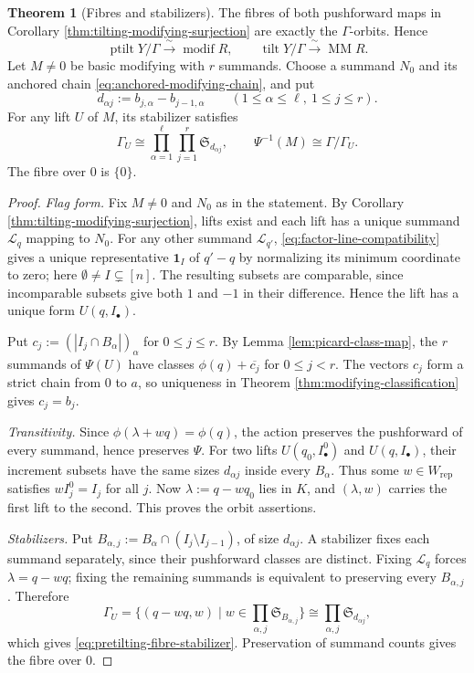 \documentclass[a4paper,reqno]{amsart}
\DeclareMathOperator{\tilt}{tilt}
\DeclareMathOperator{\ptilt}{ptilt}
\DeclareMathOperator{\modif}{modif}
\DeclareMathOperator{\MM}{MM}
\theoremstyle{definition}
\newtheorem{Thm}{Theorem}[section]
\begin{document}
\begin{Thm}[Fibres and stabilizers]\label{thm:pushforward-fibres}
The fibres of both pushforward maps in Corollary \ref{thm:tilting-modifying-surjection} are exactly the $\Gamma$-orbits. Hence
\begin{equation}\label{eq:modifying-orbit-classification}
\ptilt Y/\Gamma\xrightarrow{\ \sim\ }\modif R,
\qquad
\tilt Y/\Gamma\xrightarrow{\ \sim\ }\MM R.
\end{equation}
Let $M\ne0$ be basic modifying with $r$ summands. Choose a summand $N_0$ and its anchored chain \eqref{eq:anchored-modifying-chain}, and put
\[
d_{\alpha j}:=b_{j,\alpha}-b_{j-1,\alpha}
\qquad(1\le\alpha\le\ell,\ 1\le j\le r).
\]
For any lift $U$ of $M$, its stabilizer satisfies
\begin{equation}\label{eq:pretilting-fibre-stabilizer}
\Gamma_U\cong\prod_{\alpha=1}^\ell\prod_{j=1}^r
\mathfrak S_{d_{\alpha j}},\qquad
\Psi^{-1}(M)\cong\Gamma/\Gamma_U.
\end{equation}
The fibre over $0$ is $\{0\}$.
\end{Thm}
\begin{proof}
\emph{Flag form.}
Fix $M\ne0$ and $N_0$ as in the statement. By Corollary \ref{thm:tilting-modifying-surjection}, lifts exist and each lift has a unique summand $\mathcal L_q$ mapping to $N_0$. For any other summand $\mathcal L_{q'}$, \eqref{eq:factor-line-compatibility} gives a unique representative $\mathbf1_I$ of $q'-q$ by normalizing its minimum coordinate to zero; here $\emptyset\ne I\subsetneq[n]$. The resulting subsets are comparable, since incomparable subsets give both $1$ and $-1$ in their difference. Hence the lift has a unique form $U(q,I_\bullet)$.

Put $c_j:=(|I_j\cap B_\alpha|)_\alpha$ for $0\le j\le r$. By Lemma \ref{lem:picard-class-map}, the $r$ summands of $\Psi(U)$ have classes $\phi(q)+\overline{c_j}$ for $0\le j<r$. The vectors $c_j$ form a strict chain from $0$ to $a$, so uniqueness in Theorem \ref{thm:modifying-classification} gives $c_j=b_j$.

\emph{Transitivity.}
Since $\phi(\lambda+wq)=\phi(q)$, the action preserves the pushforward of every summand, hence preserves $\Psi$. For two lifts $U(q_0,I_\bullet^0)$ and $U(q,I_\bullet)$, their increment subsets have the same sizes $d_{\alpha j}$ inside every $B_\alpha$. Thus some $w\in W_{\mathrm{rep}}$ satisfies $wI_j^0=I_j$ for all $j$. Now $\lambda:=q-wq_0$ lies in $K$, and $(\lambda,w)$ carries the first lift to the second. This proves the orbit assertions.

\emph{Stabilizers.}
Put $B_{\alpha,j}:=B_\alpha\cap(I_j\setminus I_{j-1})$, of size $d_{\alpha j}$. A stabilizer fixes each summand separately, since their pushforward classes are distinct. Fixing $\mathcal L_q$ forces $\lambda=q-wq$; fixing the remaining summands is equivalent to preserving every $B_{\alpha,j}$. Therefore
\[
\Gamma_U=\{(q-wq,w)\mid w\in\prod_{\alpha,j}\mathfrak S_{B_{\alpha,j}}\}
\cong\prod_{\alpha,j}\mathfrak S_{d_{\alpha j}},
\]
which gives \eqref{eq:pretilting-fibre-stabilizer}. Preservation of summand counts gives the fibre over $0$.
\end{proof}
\end{document}
